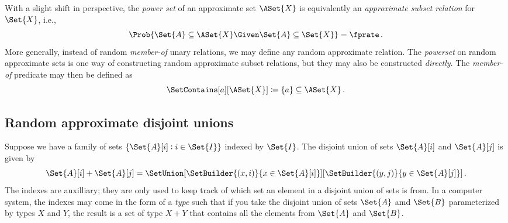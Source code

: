 \documentclass[ ../main.tex]{subfiles}
\begin{document}
With a slight shift in perspective, the \emph{power set} of an approximate set $\ASet{X}$ is equivalently an \emph{approximate subset relation} for $\Set{X}$, i.e.,
\begin{equation}
\Prob{\Set{A} \subseteq \ASet{X} \Given \Set{A} \subseteq \Set{X}} = \fprate\,.
\end{equation}
More generally, instead of random \emph{member-of} unary relations, we may define any random approximate relation.
The \emph{powerset} on random approximate sets is one way of constructing random approximate subset relations, but they may also be constructed \emph{directly}.
The \emph{member-of} predicate may then be defined as
\begin{equation}
\SetContains[a][\ASet{X}] \coloneqq \{a\} \subseteq \ASet{X}\,.
\end{equation}

\subsection{Random approximate disjoint unions}
Suppose we have a family of sets $\{\Set{A}[i] : i \in \Set{I}\}$ indexed by $\Set{I}$. The disjoint union of sets $\Set{A}[i]$ and $\Set{A}[j]$ is given by
\begin{equation}
\Set{A}[i] + \Set{A}[j] =
\SetUnion[\SetBuilder{(x,i)}{x \in \Set{A}[i]}][\SetBuilder{(y,j)}{y \in \Set{A}[j]}]\,.
\end{equation}
The indexes are auxilliary; they are only used to keep track of which set an element in a disjoint union of sets is from. In a computer system, the indexes may come in the form of a \emph{type} such that if you take the disjoint union of sets $\Set{A}$ amd $\Set{B}$ parameterized by types $X$ and $Y$, the result is a set of type $X+Y$ that contains all the elements from $\Set{A}$ and $\Set{B}$.
\end{document}
